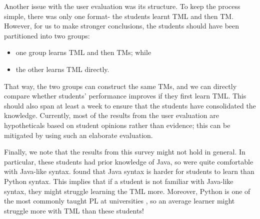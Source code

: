 Another issue with the user evaluation was its structure. To keep the process simple, there was only one format- the students learnt TML and then TM. However, for us to make stronger conclusions, the students should have been partitioned into two groups:
\begin{itemize}
    \item one group learns TML and then TMs; while
    \item the other learns TML directly.
\end{itemize}
That way, the two groups can construct the same TMs, and we can directly compare whether students' performance improves if they first learn TML. This should also span at least a week to ensure that the students have consolidated the knowledge. Currently, most of the results from the user evaluation are hypotheticals based on student opinions rather than evidence; this can be mitigated by using such an elaborate evaluation.

Finally, we note that the results from this survey might not hold in general. In particular, these students had prior knowledge of Java, so were quite comfortable with Java-like syntax. \citet{lo2015programming} found that Java syntax is harder for students to learn than Python syntax. This implies that if a student is not familiar with Java-like syntax, they might struggle learning the TML more. Moreover, Python is one of the most commonly taught PL at universities \citep{meszarosova2015python}, so an average learner might struggle more with TML than these students!
